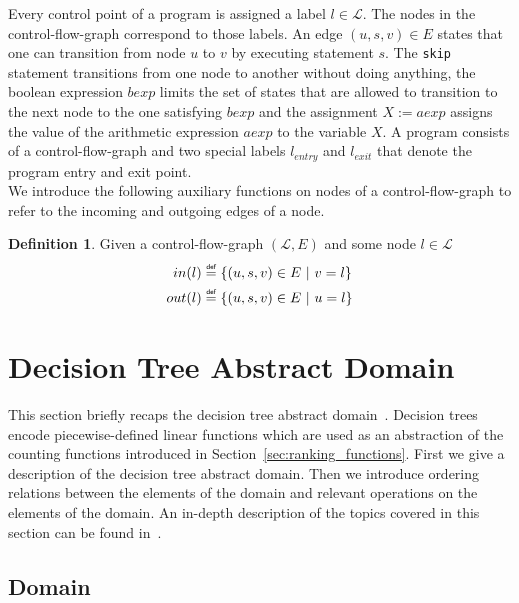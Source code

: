 \documentclass[11pt,a4paper,titlepage]{article}
\theoremstyle{definition}
\newtheorem{definition}{Definition}[section]
\newcommand\eqdef{\mathrel{\overset{\makebox[0pt]{\mbox{\normalfont\tiny\sffamily def}}}{=}}}
\begin{document}
Every control point of a program is assigned a label $l \in \mathcal{L}$. 
The nodes in the control-flow-graph correspond to those labels. 
An edge $(u, s, v) \in E$ states that one can transition from node
$u$ to $v$ by executing statement $s$. 
The \texttt{skip} statement transitions from one node to another without doing anything, 
the boolean expression $bexp$ limits the set of states
that are allowed to transition to the next node to the one satisfying $bexp$ and the assignment $X := aexp$ assigns the value of the arithmetic expression $aexp$
to the variable $X$. A program consists of a control-flow-graph and two special labels 
$l_{entry}$ and $l_{exit}$ that denote the program entry and exit point.\\

We introduce the following auxiliary functions on nodes of a control-flow-graph to 
refer to the incoming and outgoing edges of a node.

\begin{definition}\label{def:cfg_in}
    Given a control-flow-graph $(\mathcal{L}, E)$ and some node $l \in \mathcal{L}$
    \begin{align*}
        in(l) &\eqdef \{(u, s, v) \in E \ | \ v = l \}\\
        out(l) &\eqdef \{(u, s, v) \in E \ | \ u = l \}\\
    \end{align*}
\end{definition}


\section{Decision Tree Abstract Domain}\label{sec:decision_tree_abstract_domain}

This section briefly recaps the decision tree abstract domain~\cite{UrbanPhd}. 
Decision trees encode piecewise-defined linear functions which are used as an abstraction 
of the counting functions introduced in Section~\ref{sec:ranking_functions}. 
First we give a description of the decision tree abstract domain. 
Then we introduce ordering relations between the elements of the domain and relevant operations on the elements of the domain. 
An in-depth description of the topics covered in this section can be found in~\cite{UrbanPhd}.\\

\subsection{Domain}
\end{document}
